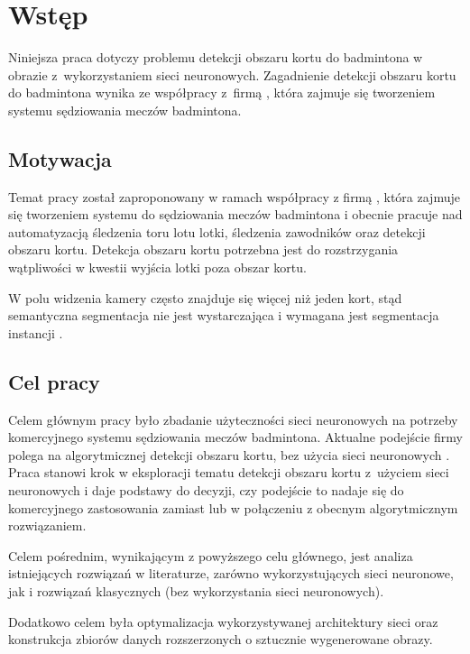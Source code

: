 \chapter{Wstęp}

Niniejsza praca dotyczy problemu detekcji obszaru kortu do badmintona w obrazie z~wykorzystaniem sieci neuronowych.
Zagadnienie detekcji obszaru kortu do badmintona wynika ze współpracy z~firmą \blue{}, która zajmuje się tworzeniem systemu sędziowania meczów badmintona.

\section{Motywacja}

Temat pracy został zaproponowany w ramach współpracy z firmą \blue{}, która zajmuje się tworzeniem systemu do sędziowania meczów badmintona i obecnie pracuje nad automatyzacją śledzenia toru lotu lotki, śledzenia zawodników oraz detekcji obszaru kortu.
Detekcja obszaru kortu potrzebna jest do rozstrzygania wątpliwości w kwestii wyjścia lotki poza obszar kortu.

W polu widzenia kamery często znajduje się więcej niż jeden kort, stąd semantyczna segmentacja nie jest wystarczająca i wymagana jest segmentacja instancji .

\section{Cel pracy}

Celem głównym pracy było zbadanie użyteczności sieci neuronowych na potrzeby komercyjnego systemu sędziowania meczów badmintona.
Aktualne podejście firmy \blue{} polega na algorytmicznej detekcji obszaru kortu, bez użycia sieci neuronowych .
Praca stanowi krok w eksploracji tematu detekcji obszaru kortu z~użyciem sieci neuronowych i daje podstawy do decyzji, czy podejście to nadaje się do komercyjnego zastosowania zamiast lub w połączeniu z obecnym algorytmicznym rozwiązaniem.

Celem pośrednim, wynikającym z powyższego celu głównego, jest analiza istniejących rozwiązań w literaturze, zarówno wykorzystujących sieci neuronowe, jak i rozwiązań klasycznych (bez wykorzystania sieci neuronowych).

Dodatkowo celem była optymalizacja wykorzystywanej architektury sieci oraz konstrukcja zbiorów danych rozszerzonych o sztucznie wygenerowane obrazy.
\\

